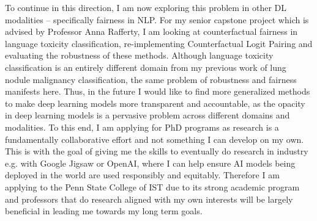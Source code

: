 \documentclass[10pt]{article}
\begin{document}
To continue in this direction, I am now exploring this problem in other DL modalities -- specifically fairness in NLP. For my senior capstone project which is advised by Professor Anna Rafferty, I am looking at counterfactual fairness in language toxicity classification, re-implementing Counterfactual Logit Pairing \cite{garg2019counterfactual} and evaluating the robustness of these methods. Although language toxicity classification is an entirely different domain from my previous work of lung nodule malignancy classification, the same problem of robustness and fairness manifests here. Thus, in the future I would like to find more generalized methods to make deep learning models more transparent and accountable, 
as the opacity in deep learning models is a pervasive problem across different domains and modalities.
To this end, I am applying for PhD programs as research is a fundamentally collaborative effort and not something I can develop on my own.
This is with the goal of giving me the skills to eventually do research in industry e.g. with Google Jigsaw or OpenAI, where I can help ensure AI models being deployed in the world are used responsibly and equitably.
Therefore I am applying to the Penn State College of IST due to its strong academic program and professors that do research aligned with my own interests will be largely beneficial in leading me towards my long term goals.


\end{document}
